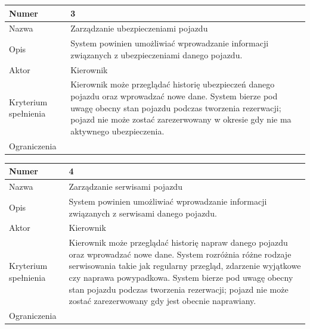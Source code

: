 \documentclass[eng,printmode,openany]{mgr}
\begin{document}
	\begin{table}[H]
		\begin{tabularx}{\textwidth}{|l|X|}
			\hline
			Numer                & 3 \\ \hline
			Nazwa                & Zarządzanie ubezpieczeniami pojazdu \\ \hline
			Opis                 & System powinien umożliwiać wprowadzanie informacji związanych z ubezpieczeniami danego pojazdu. \\ \hline
			Aktor                & Kierownik \\ \hline
			Kryterium spełnienia & Kierownik może przeglądać historię ubezpieczeń danego pojazdu oraz wprowadzać nowe dane. System bierze pod uwagę obecny stan pojazdu podczas tworzenia rezerwacji;  pojazd nie może zostać zarezerwowany w okresie gdy nie ma aktywnego ubezpieczenia. \\ \hline
			Ograniczenia         & \\ \hline
		\end{tabularx}
	\end{table}
	
	\begin{table}[H]
		\begin{tabularx}{\textwidth}{|l|X|}
			\hline
			Numer                & 4 \\ \hline
			Nazwa                & Zarządzanie serwisami pojazdu \\ \hline
			Opis                 & System powinien umożliwiać wprowadzanie informacji związanych z serwisami danego pojazdu. \\ \hline
			Aktor                & Kierownik \\ \hline
			Kryterium spełnienia & Kierownik może przeglądać historię napraw danego pojazdu oraz wprowadzać nowe dane. System rozróżnia różne rodzaje serwisowania takie jak regularny przegląd, zdarzenie wyjątkowe czy naprawa powypadkowa. System bierze pod uwagę obecny stan pojazdu podczas tworzenia rezerwacji; pojazd nie może zostać zarezerwowany gdy jest obecnie naprawiany. \\ \hline
			Ograniczenia         & \\ \hline
		\end{tabularx}
	\end{table}
	
\end{document}
